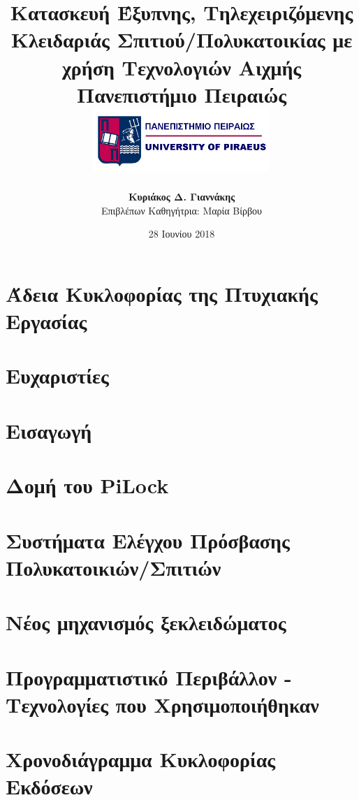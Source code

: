 \documentclass[12pt]{report}
\title{
    {Κατασκευή Έξυπνης, Τηλεχειριζόμενης Κλειδαριάς Σπιτιού/Πολυκατοικίας με χρήση Τεχνολογιών Αιχμής}\\
    {\large Πανεπιστήμιο Πειραιώς}\\
    {\includegraphics[width=0.5\textwidth]{unipi_logo.jpg}}
}
\author{
    {\textbf{Κυριάκος Δ. Γιαννάκης}}\\
    {Επιβλέπων Καθηγήτρια: Μαρία Βίρβου}
}
\date{28 Ιουνίου 2018}
\begin{document}
    \maketitle
    
    \begin{abstract}
        
    \end{abstract}

    \chapter*{Άδεια Κυκλοφορίας της Πτυχιακής Εργασίας}
    

    \chapter*{Ευχαριστίες}
    
    
    \tableofcontents
    
    \chapter{Εισαγωγή}
    

    \chapter{Δομή του PiLock}
    

    \chapter{Συστήματα Ελέγχου Πρόσβασης Πολυκατοικιών/Σπιτιών}
    

    \chapter{Νέος μηχανισμός ξεκλειδώματος}
    

    \chapter{Προγραμματιστικό Περιβάλλον - Τεχνολογίες που Χρησιμοποιήθηκαν}
    

    \chapter{Χρονοδιάγραμμα Κυκλοφορίας Εκδόσεων}
    
\end{document}
